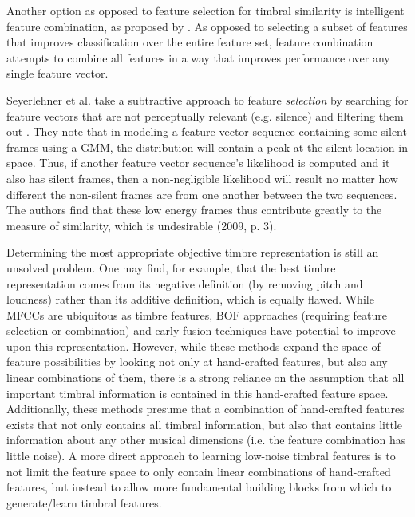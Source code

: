 \documentclass[a4paper,12pt]{report} 	%
\numberwithin{figure}{chapter}
\numberwithin{table}{chapter}
\numberwithin{equation}{chapter}
\begin{document}
\begin{flushleft}
Another option as opposed to feature selection for timbral similarity is intelligent feature combination, as proposed by \cite{Fu:2009mz}. As opposed to selecting a subset of features that improves classification over the entire feature set, feature combination attempts to combine all features in a way that  improves performance over any single feature vector.

Seyerlehner et al. take a subtractive approach to feature \emph{selection} by searching for feature vectors that are not perceptually relevant (e.g. silence) and filtering them out \cite{Seyerlehner:2009hs}. They note that in modeling a feature vector sequence containing some silent frames using a GMM, the distribution will contain a peak at the silent location in space. Thus, if another feature vector sequence's likelihood is computed and it also has silent frames, then a non-negligible likelihood will result no matter how different the non-silent frames are from one another between the two sequences. The authors find that these low energy frames thus contribute greatly to the measure of similarity, which is undesirable (2009, p. 3).

Determining the most appropriate objective timbre representation is still an unsolved problem. One may find, for example, that the best timbre representation comes from its negative definition (by removing pitch and loudness) rather than its additive definition, which is equally flawed. While MFCCs are ubiquitous as timbre features, BOF approaches (requiring feature selection or combination) and early fusion techniques have potential to improve upon this representation. However, while these methods expand the space of feature possibilities by looking not only at hand-crafted features, but also any linear combinations of them, there is a strong reliance on the assumption that all important timbral information is contained in this hand-crafted feature space. Additionally, these methods presume that a combination of hand-crafted features exists that not only contains all timbral information, but also that contains little information about any other musical dimensions (i.e. the feature combination has little noise). A more direct approach to learning low-noise timbral features is to not limit the feature space to only contain linear combinations of hand-crafted features, but instead to allow more fundamental building blocks from which to generate/learn timbral features.


\end{flushleft}
\end{document}
